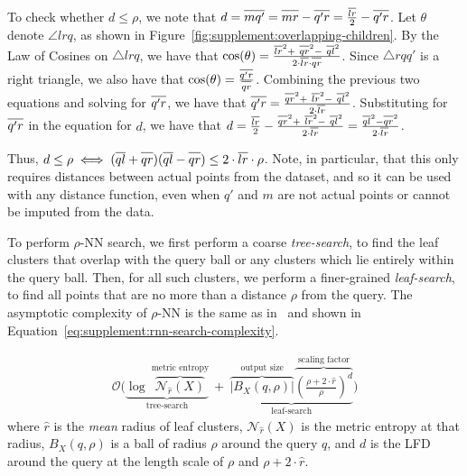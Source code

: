\documentclass{article}
\begin{document}
To check whether $d \leq \rho$, we note that $d = \overline{m q' \vphantom{l}} = \overline{m r \vphantom{l}} - \overline{q' r \vphantom{l}} = \frac{\overline{l r}}{2} - \overline{q' r \vphantom{l}}$.
Let $\theta$ denote $\angle l r q$, as shown in Figure~\ref{fig:supplement:overlapping-children}.
By the Law of Cosines on $\triangle l r q$, we have that $\text{cos}(\theta) = \tfrac{\overline{l r}^2 + \ \overline{q r \vphantom{l}}^2 - \ \overline{q l}^2}{2 \cdot \overline{l r} \cdot \overline{q r \vphantom{l}}}$.
Since $\triangle r q q'$ is a right triangle, we also have that $\text{cos}(\theta) = \tfrac{\overline{q' r \vphantom{l}}}{\overline{q r \vphantom{l}}}$.
Combining the previous two equations and solving for $\overline{q' r \vphantom{l}}$, we have that $\overline{q' r \vphantom{l}} = \tfrac{\overline{q r \vphantom{l}}^2 + \ \overline{l r}^2 - \ \overline{q l}^2}{2 \cdot \overline{l r}}$.
Substituting for $\overline{q' r \vphantom{l}}$ in the equation for $d$, we have that $d = \tfrac{\overline{l r}}{2} - \tfrac{\overline{q r \vphantom{l}}^2 + \ \overline{l r}^2 - \ \overline{q l}^2}{2 \cdot \overline{l r}} = \tfrac{\overline{q l}^2 - \overline{q r \vphantom{l}}^2}{2 \cdot \overline{l r}}$.


Thus, $d \leq \rho \iff (\overline{q l} + \overline{q r \vphantom{l}})(\overline{q l} - \overline{q r \vphantom{l}}) \leq 2 \cdot \overline{l r} \cdot \rho$. Note, in particular, that this only requires distances between actual points from the dataset, and so it can be used with any distance function, even when $q'$ and $m$ are not actual points or cannot be imputed from the data.

To perform $\rho$-NN search, we first perform a coarse \textit{tree-search}, to find the leaf clusters that overlap with the query ball or any clusters which lie entirely within the query ball.
Then, for all such clusters, we perform a finer-grained \textit{leaf-search}, to find all points that are no more than a distance $\rho$ from the query.
The asymptotic complexity of $\rho$-NN is the same as in~\cite{ishaq2019clustered} and shown in Equation~\ref{eq:supplement:rnn-search-complexity}.

\begin{gather}
    \mathcal{O}
    \Bigg(
        \underbrace{
            \log~\overbrace{\mathcal{N}_{\hat{r}}(X)}^{\textrm{metric entropy}}
        }_{\textrm{tree-search}}
        \ + \
        \underbrace{
            \overbrace{ \big| B_X(q, \rho) \big|}^{\textrm{output size}}
            \overbrace{ \left( \frac{\rho + 2 \cdot \hat{r}}{ \rho} \right) ^ d}^{\textrm{scaling factor}}
        }_{\textrm{leaf-search}}
    \Bigg)
    \label{eq:supplement:rnn-search-complexity}
\end{gather}
where $\hat{r}$ is the \textit{mean} radius of leaf clusters, $\mathcal{N}_{\hat{r}}(X)$ is the metric entropy at that radius, $B_X(q, \rho)$ is a ball of radius $\rho$ around the query $q$, and $d$ is the LFD around the query at the length scale of $\rho$ and $\rho + 2 \cdot \hat{r}$.
\end{document}
